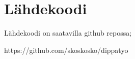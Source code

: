 \chapter{Lähdekoodi}%
\label{ch:liite}

Lähdekoodi on saatavilla github repossa;

https://github.com/skoskosko/dippatyo